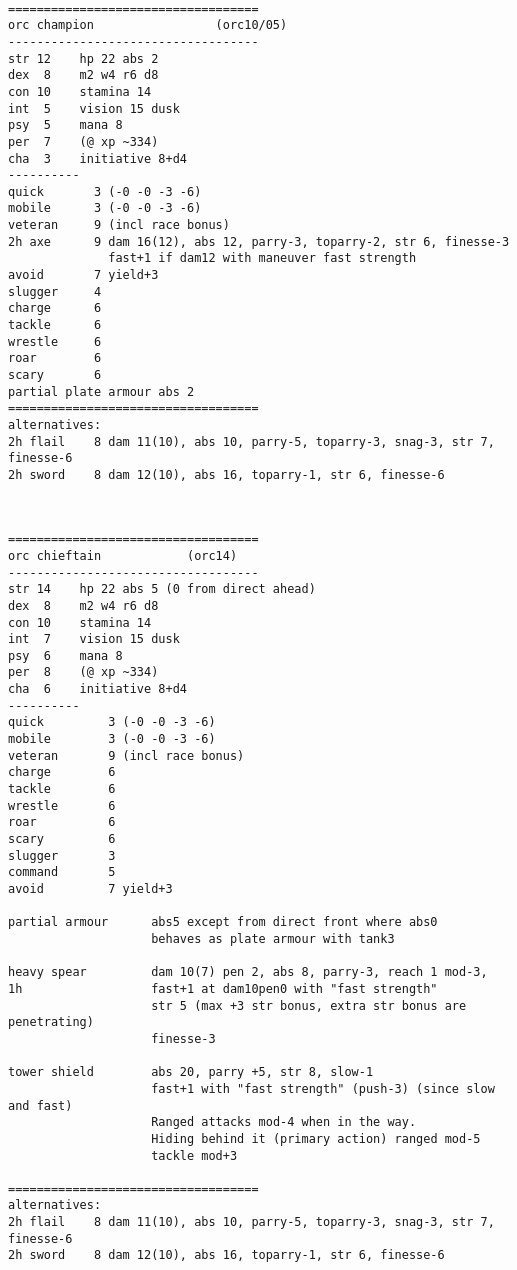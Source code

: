 \

\goodbreak \begin{samepage} \small \begin{verbatim}
===================================
orc champion                 (orc10/05)
-----------------------------------
str 12    hp 22 abs 2
dex  8    m2 w4 r6 d8
con 10    stamina 14
int  5    vision 15 dusk
psy  5    mana 8
per  7    (@ xp ~334)
cha  3    initiative 8+d4
----------
quick       3 (-0 -0 -3 -6)
mobile      3 (-0 -0 -3 -6)
veteran     9 (incl race bonus)
2h axe      9 dam 16(12), abs 12, parry-3, toparry-2, str 6, finesse-3
              fast+1 if dam12 with maneuver fast strength
avoid       7 yield+3
slugger     4
charge      6
tackle      6
wrestle     6
roar        6
scary       6
partial plate armour abs 2
===================================
alternatives:
2h flail    8 dam 11(10), abs 10, parry-5, toparry-3, snag-3, str 7, finesse-6
2h sword    8 dam 12(10), abs 16, toparry-1, str 6, finesse-6
\end{verbatim} \normalsize \end{samepage}

\

\goodbreak \begin{samepage} \small \begin{verbatim}
===================================
orc chieftain            (orc14)
-----------------------------------
str 14    hp 22 abs 5 (0 from direct ahead)
dex  8    m2 w4 r6 d8
con 10    stamina 14
int  7    vision 15 dusk
psy  6    mana 8
per  8    (@ xp ~334)
cha  6    initiative 8+d4
----------
quick         3 (-0 -0 -3 -6)
mobile        3 (-0 -0 -3 -6)
veteran       9 (incl race bonus)
charge        6
tackle        6
wrestle       6
roar          6
scary         6
slugger       3
command       5
avoid         7 yield+3

partial armour      abs5 except from direct front where abs0
                    behaves as plate armour with tank3

heavy spear         dam 10(7) pen 2, abs 8, parry-3, reach 1 mod-3,
1h                  fast+1 at dam10pen0 with "fast strength"
                    str 5 (max +3 str bonus, extra str bonus are penetrating)
                    finesse-3

tower shield        abs 20, parry +5, str 8, slow-1
                    fast+1 with "fast strength" (push-3) (since slow and fast)
                    Ranged attacks mod-4 when in the way.
                    Hiding behind it (primary action) ranged mod-5
                    tackle mod+3

===================================
alternatives:
2h flail    8 dam 11(10), abs 10, parry-5, toparry-3, snag-3, str 7, finesse-6
2h sword    8 dam 12(10), abs 16, toparry-1, str 6, finesse-6
\end{verbatim} \normalsize \end{samepage}


